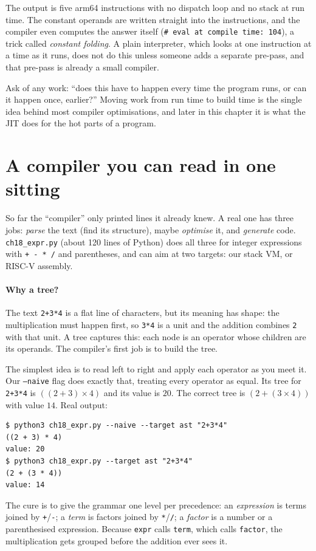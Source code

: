 The output is five arm64 instructions with no dispatch loop and no stack
at run time. The constant operands are written straight into the
instructions, and the compiler even computes the answer itself
(\texttt{\# eval at compile time: 104}), a trick called \emph{constant
folding}. A plain interpreter, which looks at one instruction at a time as it
runs, does not do this unless someone adds a separate pre-pass,
and that pre-pass is already a small compiler.

\begin{principle}
Ask of any work: ``does this have to happen every time the program
runs, or can it happen once, earlier?'' Moving work from run time to build
time is the single idea behind most compiler optimisations, and later in this
chapter it is what the JIT does for the hot parts of a program.
\end{principle}


\section{A compiler you can read in one sitting}

So far the ``compiler'' only printed lines it already knew. A real
one has three jobs: \emph{parse} the text (find its structure), maybe
\emph{optimise} it, and \emph{generate} code. \texttt{ch18\_expr.py}
(about 120 lines of Python) does all three for integer expressions with
\texttt{+ - * /} and parentheses, and can aim at two targets: our stack
VM, or RISC-V assembly.

\paragraph{Why a tree?} The text \texttt{2+3*4} is a flat line of
characters, but its meaning has shape: the multiplication must happen
first, so \texttt{3*4} is a unit and the addition combines \texttt{2}
with that unit. A tree captures this: each node is an operator whose
children are its operands. The compiler's first job is to build the tree.

\begin{example}
The simplest idea is to read left to right and apply each operator as
you meet it. Our \texttt{--naive} flag does exactly that, treating every operator as equal.
Its tree for \texttt{2+3*4} is $((2+3)\times 4)$ and its value is
$20$. The correct tree is $(2+(3\times4))$ with value $14$. Real output:
\begin{verbatim}
$ python3 ch18_expr.py --naive --target ast "2+3*4"
((2 + 3) * 4)
value: 20
$ python3 ch18_expr.py --target ast "2+3*4"
(2 + (3 * 4))
value: 14
\end{verbatim}
The cure is to give the grammar one level per precedence: an
\emph{expression} is terms joined by \texttt{+}/\texttt{-}; a
\emph{term} is factors joined by \texttt{*}/\texttt{/}; a \emph{factor}
is a number or a parenthesised expression. Because \texttt{expr} calls
\texttt{term}, which calls \texttt{factor}, the multiplication gets
grouped before the addition ever sees it.
\end{example}

